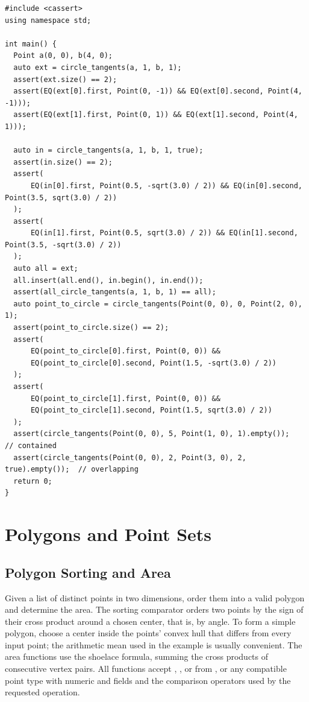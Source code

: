 \begin{lstlisting}[style=cpp]
#include <cassert>
using namespace std;

int main() {
  Point a(0, 0), b(4, 0);
  auto ext = circle_tangents(a, 1, b, 1);
  assert(ext.size() == 2);
  assert(EQ(ext[0].first, Point(0, -1)) && EQ(ext[0].second, Point(4, -1)));
  assert(EQ(ext[1].first, Point(0, 1)) && EQ(ext[1].second, Point(4, 1)));

  auto in = circle_tangents(a, 1, b, 1, true);
  assert(in.size() == 2);
  assert(
      EQ(in[0].first, Point(0.5, -sqrt(3.0) / 2)) && EQ(in[0].second, Point(3.5, sqrt(3.0) / 2))
  );
  assert(
      EQ(in[1].first, Point(0.5, sqrt(3.0) / 2)) && EQ(in[1].second, Point(3.5, -sqrt(3.0) / 2))
  );
  auto all = ext;
  all.insert(all.end(), in.begin(), in.end());
  assert(all_circle_tangents(a, 1, b, 1) == all);
  auto point_to_circle = circle_tangents(Point(0, 0), 0, Point(2, 0), 1);
  assert(point_to_circle.size() == 2);
  assert(
      EQ(point_to_circle[0].first, Point(0, 0)) &&
      EQ(point_to_circle[0].second, Point(1.5, -sqrt(3.0) / 2))
  );
  assert(
      EQ(point_to_circle[1].first, Point(0, 0)) &&
      EQ(point_to_circle[1].second, Point(1.5, sqrt(3.0) / 2))
  );
  assert(circle_tangents(Point(0, 0), 5, Point(1, 0), 1).empty());        // contained
  assert(circle_tangents(Point(0, 0), 2, Point(3, 0), 2, true).empty());  // overlapping
  return 0;
}
\end{lstlisting}

\section{\texorpdfstring{Polygons and Point Sets}{7.3 Polygons and Point Sets}}
\setcounter{section}{3}
\setcounter{subsection}{0}
\subsection{Polygon Sorting and Area}
\label{sec:7.3.1}
Given a list of distinct points in two dimensions, order them into a valid polygon and determine the area. The sorting comparator orders two points by the sign of their cross product around a chosen center, that is, by angle. To form a simple polygon, choose a center inside the points' convex hull that differs from every input point; the arithmetic mean used in the example is usually convenient. The area functions use the shoelace formula, summing the cross products of consecutive vertex pairs. All functions accept , , or  from , or any compatible point type with numeric  and  fields and the comparison operators used by the requested operation.

